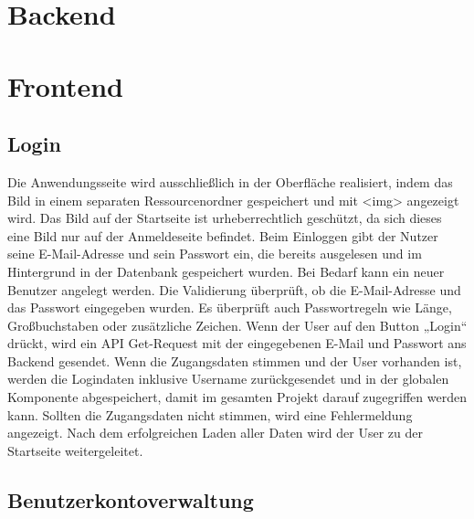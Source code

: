 \section{Backend}
\author{Stefano Pyringer}
\lipsum[50]
\newpage

\section{Frontend}
\author{Mirzet Sakonjic}
\subsection*{Login}
Die Anwendungsseite wird ausschließlich in der Oberfläche realisiert, 
indem das Bild in einem separaten Ressourcenordner gespeichert und mit <img> 
angezeigt wird. Das Bild auf der Startseite ist urheberrechtlich geschützt, 
da sich dieses eine Bild nur auf der Anmeldeseite befindet. Beim Einloggen gibt 
der Nutzer seine E-Mail-Adresse und sein Passwort ein, die bereits ausgelesen 
und im Hintergrund in der Datenbank gespeichert wurden. Bei Bedarf kann ein 
neuer Benutzer angelegt werden. Die Validierung überprüft, ob die E-Mail-Adresse 
und das Passwort eingegeben wurden. Es überprüft auch Passwortregeln wie Länge, 
Großbuchstaben oder zusätzliche Zeichen.
Wenn der User auf den Button „Login“ drückt, wird ein API Get-Request mit der
eingegebenen E-Mail und Passwort ans Backend gesendet. Wenn die Zugangsdaten
stimmen und der User vorhanden ist, werden die Logindaten inklusive Username
zurückgesendet und in der globalen Komponente abgespeichert, damit im gesamten
Projekt darauf zugegriffen werden kann.
Sollten die Zugangsdaten nicht stimmen, wird eine Fehlermeldung angezeigt.
Nach dem erfolgreichen Laden aller Daten wird der User zu der Startseite
weitergeleitet.

\subsection*{Benutzerkontoverwaltung}